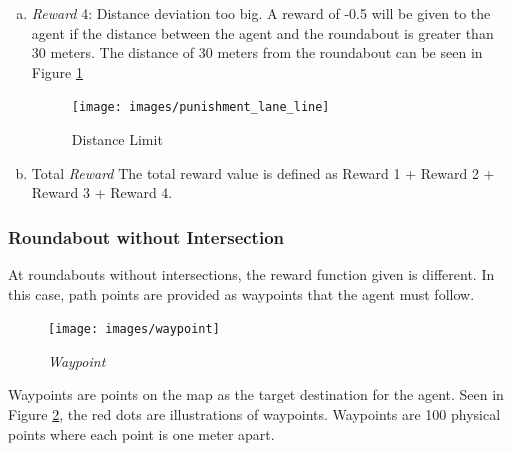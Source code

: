 \documentclass[conference]{IEEEtran}
\begin{document}
\begin{enumerate}[a)]
\item \textit{Reward} 4: Distance deviation too big.
A reward of -0.5 will be given to the agent if the distance between the agent and the roundabout is greater than 30 meters. The distance of 30 meters from the roundabout can be seen in Figure \ref{fig:punishment_lane_line}

\begin{figure}[H] 
	\centering
	\texttt{[image: images/punishment\_lane\_line]}
	\caption{Distance Limit}
	\label{fig:punishment_lane_line}
\end{figure}

\item{Total \textit{Reward }}
The total reward value is defined as Reward 1 + Reward 2 + Reward 3 + Reward 4.

\end{enumerate}


\subsubsection{Roundabout without Intersection}
At roundabouts without intersections, the reward function given is different. In this case, path points are provided as waypoints that the agent must follow.

\begin{figure}[H] 
	\centering
	\texttt{[image: images/waypoint]}
	\caption{\textit{Waypoint}}
	\label{fig:waypoint}
\end{figure}

Waypoints are points on the map as the target destination for the agent. Seen in Figure \ref{fig:waypoint}, the red dots are illustrations of waypoints. Waypoints are 100 physical points where each point is one meter apart.
\end{document}
